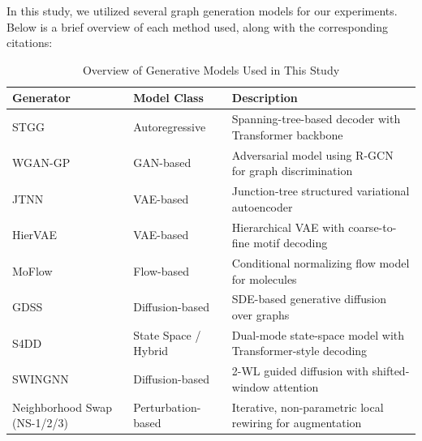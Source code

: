 In this study, we utilized several graph generation models for our experiments. Below is a brief overview of each method used, along with the corresponding citations:
\begin{table}[H]
\centering
\caption{Overview of Generative Models Used in This Study}
\label{tab:generator_summary}
\renewcommand{\arraystretch}{0.5}
\setlength{\tabcolsep}{1pt}

\begin{scriptsize} %
\begin{tabular}{@{}lll@{}}
\toprule
\textbf{Generator} & \textbf{Model Class} & \textbf{Description} \\
\midrule
STGG~\cite{ahn2021spanning} & Autoregressive & Spanning-tree-based decoder with Transformer backbone \\
WGAN-GP~\cite{keras2021wgan} & GAN-based & Adversarial model using R-GCN for graph discrimination \\
JTNN~\cite{jin2018junction} & VAE-based & Junction-tree structured variational autoencoder \\
HierVAE~\cite{jin2020hiervae} & VAE-based & Hierarchical VAE with coarse-to-fine motif decoding \\
MoFlow~\cite{zang2020moflow} & Flow-based & Conditional normalizing flow model for molecules \\
GDSS~\cite{jo2022score} & Diffusion-based & SDE-based generative diffusion over graphs \\
S4DD~\cite{ozcelik2024s4} & State Space / Hybrid & Dual-mode state-space model with Transformer-style decoding \\
SWINGNN~\cite{yan2023swingnn} & Diffusion-based & 2-WL guided diffusion with shifted-window attention \\
Neighborhood Swap (NS-1/2/3) & Perturbation-based & Iterative, non-parametric local rewiring for augmentation \\
\bottomrule
\end{tabular}
\end{scriptsize}

\end{table}
